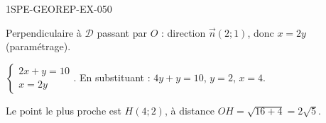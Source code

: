 \begin{corrige}{1SPE-GEOREP-EX-050}


Perpendiculaire à $\mathcal{D}$ passant par $O$ : direction $\vec{n}(2 ; 1)$, donc $x = 2y$ (paramétrage).

$\begin{cases} 2x + y = 10 \\ x = 2y \end{cases}$. En substituant : $4y + y = 10$, $y = 2$, $x = 4$.

Le point le plus proche est $H(4 ; 2)$, à distance $OH = \sqrt{16 + 4} = 2\sqrt{5}$.

\end{corrige}
